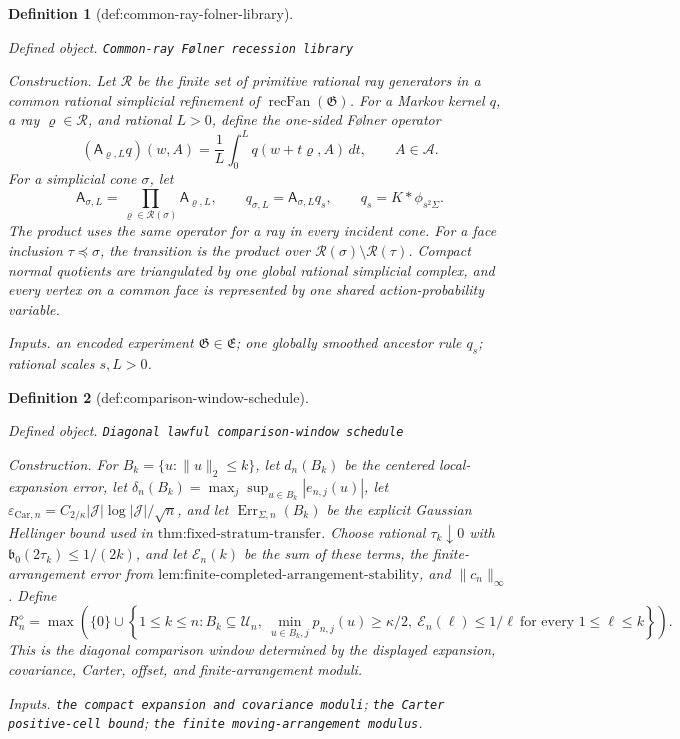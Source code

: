 \documentclass{article}
\newtheorem{definition}{Definition}
\begin{document}
\begin{definition}[def:common-ray-folner-library]\label{def:common-ray-folner-library}
\par\smallskip\noindent\emph{Defined object.} \texttt{Common-\allowbreak{}ray Følner recession library}
\par\smallskip\noindent\emph{Construction.} Let \(\mathscr R\) be the finite set of primitive rational ray generators in a common rational simplicial refinement of \(\operatorname{recFan}(\mathfrak G)\). For a Markov kernel \(q\), a ray \(\varrho\in\mathscr R\), and rational \(L>0\), define the one-sided Følner operator
\[
 (\mathsf A_{\varrho,L}q)(w,A)
 =\frac1L\int_0^Lq(w+t\varrho,A)\,dt,
 \qquad A\in\mathcal A.
\]
For a simplicial cone \(\sigma\), let
\[
 \mathsf A_{\sigma,L}=\prod_{\varrho\in\mathscr R(\sigma)}
 \mathsf A_{\varrho,L},
 \qquad q_{\sigma,L}=\mathsf A_{\sigma,L}q_s,
 \qquad q_s=K*\phi_{s^2\Sigma}.
\]
The product uses the same operator for a ray in every incident cone. For a face inclusion \(\tau\preceq\sigma\), the transition is the product over \(\mathscr R(\sigma)\setminus\mathscr R(\tau)\). Compact normal quotients are triangulated by one global rational simplicial complex, and every vertex on a common face is represented by one shared action-probability variable.
\par\smallskip\noindent\emph{Inputs.} an encoded experiment \(\mathfrak G\in\mathfrak E\); one globally smoothed ancestor rule \(q_s\); rational scales \(s,L>0\).
\end{definition}

\begin{definition}[def:comparison-window-schedule]\label{def:comparison-window-schedule}
\par\smallskip\noindent\emph{Defined object.} \texttt{Diagonal lawful comparison-\allowbreak{}window schedule}
\par\smallskip\noindent\emph{Construction.} For \(B_k=\{u:\|u\|_2\le k\}\), let \(d_n(B_k)\) be the centered local-expansion error, let \(\delta_n(B_k)=\max_j\sup_{u\in B_k}|e_{n,j}(u)|\), let \(\varepsilon_{\mathrm{Car},n}=C_{2/\kappa}|\mathcal J|\log|\mathcal J|/\sqrt n\), and let \(\operatorname{Err}_{\Sigma,n}(B_k)\) be the explicit Gaussian Hellinger bound used in \(\text{thm:fixed-stratum-transfer}\). Choose rational \(\tau_k\downarrow0\) with \(\mathfrak b_0(2\tau_k)\le1/(2k)\), and let \(\mathscr E_n(k)\) be the sum of these terms, the finite-arrangement error from \(\text{lem:finite-completed-arrangement-stability}\), and \(\|c_n\|_\infty\). Define
\[
 R_n^{\diamond}=\max\left(\{0\}\cup\left\{1\le k\le n:
 B_k\subseteq\mathcal U_n,\ \min_{u\in B_k,j}p_{n,j}(u)\ge\kappa/2,
 \ \mathscr E_n(\ell)\le1/\ell\ \text{for every }1\le\ell\le k\right\}\right).
\]
This is the diagonal comparison window determined by the displayed expansion, covariance, Carter, offset, and finite-arrangement moduli.
\par\smallskip\noindent\emph{Inputs.} \texttt{the compact expansion and covariance moduli}; \texttt{the Carter positive-\allowbreak{}cell bound}; \texttt{the finite moving-\allowbreak{}arrangement modulus}.
\end{definition}
\end{document}
